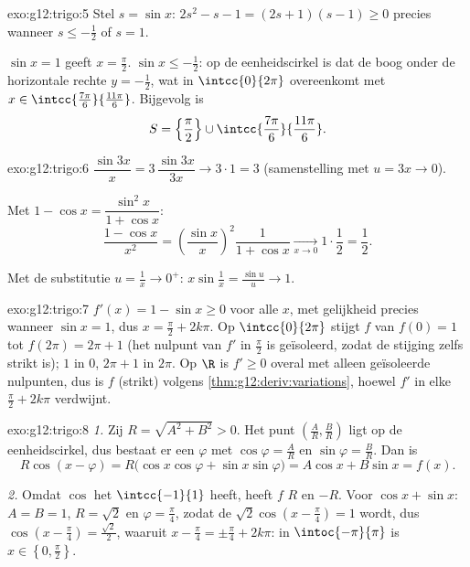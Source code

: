\begin{solution}{exo:g12:trigo:5}
Stel $s = \sin x$: $2s^2 - s - 1 = (2s + 1)(s - 1) \geq 0$ precies wanneer
$s \leq -\frac12$ of $s = 1$.

$\sin x = 1$ geeft $x = \frac\pi2$. $\sin x \leq -\frac12$: op de
eenheidscirkel is dat de boog onder de horizontale rechte $y = -\frac12$, wat
in $\intcc{0}{2\pi}$ overeenkomt met
$x \in \intcc{\frac{7\pi}{6}}{\frac{11\pi}{6}}$. Bijgevolg is
\[
S = \left\{\frac{\pi}{2}\right\} \cup
\intcc{\frac{7\pi}{6}}{\frac{11\pi}{6}} .
\]
\end{solution}

\begin{solution}{exo:g12:trigo:6}
$\dfrac{\sin 3x}{x} = 3\,\dfrac{\sin 3x}{3x} \to 3 \cdot 1 = 3$
(samenstelling met $u = 3x \to 0$).

Met $1 - \cos x = \dfrac{\sin^2 x}{1 + \cos x}$:
\[
\frac{1 - \cos x}{x^2}
= \left(\frac{\sin x}{x}\right)^{\!2} \frac{1}{1 + \cos x}
\xrightarrow[x\to0]{} 1 \cdot \frac12 = \frac12 .
\]

Met de substitutie $u = \frac1x \to 0^+$:
$x \sin\frac1x = \frac{\sin u}{u} \to 1$.
\end{solution}

\begin{solution}{exo:g12:trigo:7}
$f'(x) = 1 - \sin x \geq 0$ voor alle $x$, met gelijkheid precies wanneer
$\sin x = 1$, dus $x = \frac\pi2 + 2k\pi$. Op $\intcc{0}{2\pi}$ stijgt $f$
van $f(0) = 1$ tot $f(2\pi) = 2\pi + 1$ (het nulpunt van $f'$ in
$\frac{\pi}{2}$ is geïsoleerd, zodat de stijging zelfs strikt is); 
$1$ in $0$,  $2\pi + 1$ in $2\pi$. Op $\R$ is $f' \geq 0$ overal met
alleen geïsoleerde nulpunten, dus is $f$ (strikt)  volgens
\cref{thm:g12:deriv:variations}, hoewel $f'$ in elke $\frac\pi2 + 2k\pi$
verdwijnt.
\end{solution}

\begin{solution}{exo:g12:trigo:8}
\emph{1.} Zij $R = \sqrt{A^2 + B^2} > 0$. Het punt
$\left(\frac AR, \frac BR\right)$ ligt op de eenheidscirkel, dus bestaat er
een $\varphi$ met $\cos\varphi = \frac AR$ en $\sin\varphi = \frac BR$. Dan
is
\[
R\cos(x - \varphi) = R\bigl(\cos x\cos\varphi + \sin x \sin\varphi\bigr)
= A\cos x + B\sin x = f(x).
\]

\emph{2.} Omdat $\cos$ het  $\intcc{-1}{1}$ heeft, heeft $f$  $R$
en  $-R$. Voor $\cos x + \sin x$: $A = B = 1$, $R = \sqrt2$ en
$\varphi = \frac\pi4$, zodat de 
$\sqrt2\cos\left(x - \frac\pi4\right) = 1$ wordt, dus
$\cos\left(x - \frac\pi4\right) = \frac{\sqrt2}{2}$, waaruit
$x - \frac\pi4 = \pm\frac\pi4 + 2k\pi$: in $\intoc{-\pi}{\pi}$ is
$x \in \left\{0, \frac\pi2\right\}$.
\end{solution}

